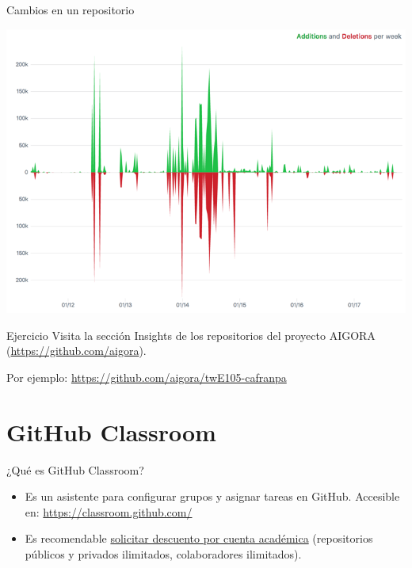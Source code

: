\documentclass[xcolor={usenames,svgnames,dvipsnames}]{beamer}
\begin{document}
\begin{frame}[label={sec:orgc344e28}]{Cambios en un repositorio}
\begin{center}
\includegraphics[width=.9\linewidth]{figs/repo_code_frequency_graph_dotcom.png}
\end{center}
\end{frame}

\begin{frame}[label={sec:org4a7bd2f}]{}
\begin{block}{Ejercicio}
Visita la sección Insights de los repositorios del proyecto AIGORA (\url{https://github.com/aigora}). 

Por ejemplo: \url{https://github.com/aigora/twE105-cafranpa}
\end{block}
\end{frame}

\section{GitHub Classroom}
\label{sec:orgd65cbd8}

\begin{frame}[label={sec:org6a5b487}]{¿Qué es GitHub Classroom?}
\begin{itemize}
\item Es un asistente para configurar grupos y asignar tareas en GitHub. Accesible en: \url{https://classroom.github.com/}

\item Es recomendable \href{https://help.github.com/en/articles/applying-for-an-educator-or-researcher-discount}{solicitar descuento por cuenta académica} (repositorios públicos y privados ilimitados, colaboradores ilimitados).
\end{itemize}
\end{frame}
\end{document}
